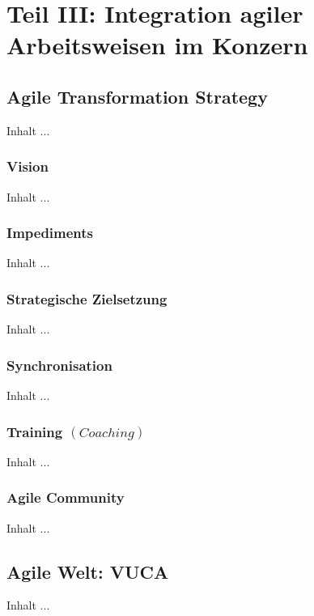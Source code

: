 
\chapter{Teil III: Integration agiler Arbeitsweisen im Konzern}
\minitoc 
\vspace{1 cm} 

\section{Agile Transformation Strategy}
Inhalt ...

\subsection{Vision}
Inhalt ...

\subsection{Impediments}
Inhalt ...

\subsection{Strategische Zielsetzung}
Inhalt ...

\subsection{Synchronisation}
Inhalt ...

\subsection{Training $(Coaching)$}
Inhalt ...

\subsection{Agile Community}
Inhalt ...


\section{Agile Welt: VUCA}
Inhalt ...

